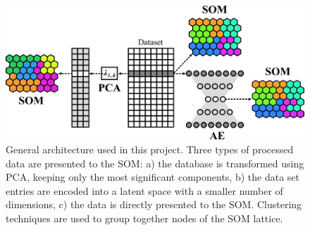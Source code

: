 \documentclass[utf8]{frontiersSCNS} %
\begin{document}
\begin{figure}[h!]
	\begin{center}
		\includegraphics[width=12cm]{architecture}%
	\end{center}
	\caption{General architecture used in this project. Three types of processed data are presented to the SOM: a) the database is transformed using PCA, keeping only the most significant components, b) the data set entries are encoded into a latent space with a smaller number of dimensions, c) the data is directly presented to the SOM. Clustering techniques are used to group together nodes of the SOM lattice.}\label{fig:architecture}
\end{figure}
\end{document}
